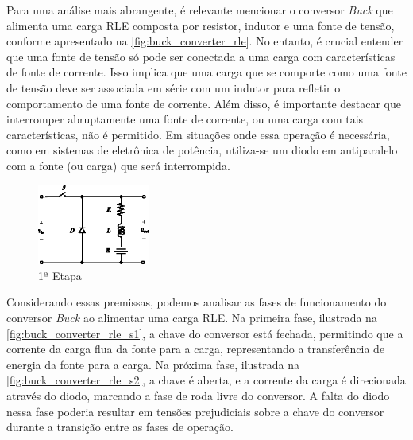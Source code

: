 Para uma análise mais abrangente, é relevante mencionar o conversor \textit{Buck} que alimenta uma carga RLE composta por resistor, indutor e uma fonte de tensão, conforme apresentado na \autoref{fig:buck_converter_rle}. No entanto, é crucial entender que uma fonte de tensão só pode ser conectada a uma carga com características de fonte de corrente. Isso implica que uma carga que se comporte como uma fonte de tensão deve ser associada em série com um indutor para refletir o comportamento de uma fonte de corrente. Além disso, é importante destacar que interromper abruptamente uma fonte de corrente, ou uma carga com tais características, não é permitido. Em situações onde essa operação é necessária, como em sistemas de eletrônica de potência, utiliza-se um diodo em antiparalelo com a fonte (ou carga) que será interrompida. 

\begin{figure}[H]
  \centering
  \includegraphics[width=0.33\textwidth]{figuras/buck_converter_rle.eps}
  \caption{1ª Etapa}
  \label{fig:buck_converter_rle}
\end{figure}

Considerando essas premissas, podemos analisar as fases de funcionamento do conversor \textit{Buck} ao alimentar uma carga RLE. Na primeira fase, ilustrada na \autoref{fig:buck_converter_rle_s1}, a chave do conversor está fechada, permitindo que a corrente da carga flua da fonte para a carga, representando a transferência de energia da fonte para a carga. Na próxima fase, ilustrada na \autoref{fig:buck_converter_rle_s2}, a chave é aberta, e a corrente da carga é direcionada através do diodo, marcando a fase de roda livre do conversor. A falta do diodo nessa fase poderia resultar em tensões prejudiciais sobre a chave do conversor durante a transição entre as fases de operação. 

